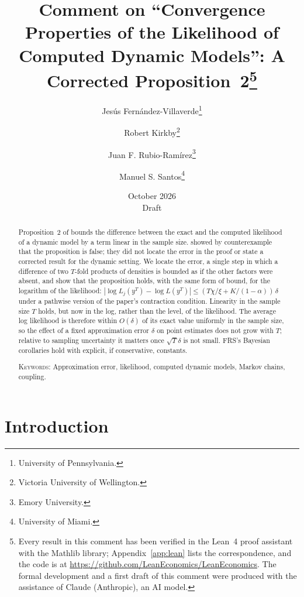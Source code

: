 \documentclass[11pt]{article}
\title{Comment on ``Convergence Properties of the Likelihood of\\ Computed Dynamic Models'':
A Corrected Proposition~2\thanks{Every result in this comment has been verified in the Lean~4
proof assistant with the Mathlib library; Appendix~\ref{app:lean} lists the correspondence, and the
code is at \url{https://github.com/LeanEconomics/LeanEconomics}. The formal development and a
first draft of this comment were produced with the assistance of Claude (Anthropic), an AI
model.}}
\author{Jes\'us Fern\'andez-Villaverde\thanks{University of Pennsylvania.}
\and Robert Kirkby\thanks{Victoria University of Wellington.}
\and Juan F. Rubio-Ram\'irez\thanks{Emory University.}
\and Manuel S. Santos\thanks{University of Miami.}}
\date{October 2026\\[0.5em]\small Draft}
\theoremstyle{definition}
\theoremstyle{remark}
\begin{document}
\maketitle

\begin{abstract}
\noindent
Proposition~2 of \cite*{FRS2006} bounds the difference between the exact and the computed
likelihood of a dynamic model by a term linear in the sample size. \cite*{AGH2009} showed by
counterexample that the proposition is false; they did not locate the error in the proof or
state a corrected result for the dynamic setting. We locate the error, a single step in which a
difference of two $T$-fold products of densities is bounded as if the other factors were absent,
and show that the proposition holds, with the same form of bound, for the logarithm of the
likelihood: $|\log L_j(y^T) - \log L(y^T)| \le (T\chi/\xi + K/(1-\alpha))\,\delta$ under a
pathwise version of the paper's contraction condition. Linearity in the sample size $T$ holds,
but now in the log, rather than the level, of the likelihood. The
average log likelihood is therefore within $O(\delta)$ of its exact value uniformly in the sample
size, so the effect of a fixed approximation error $\delta$ on point estimates does not grow with $T$;
relative to sampling uncertainty it matters once $\sqrt{T}\delta$ is not small. FRS's Bayesian
corollaries hold with explicit, if conservative, constants.

\medskip\noindent\textsc{Keywords:} Approximation error, likelihood, computed dynamic models,
Markov chains, coupling.
\end{abstract}

\section{Introduction}
\end{document}
